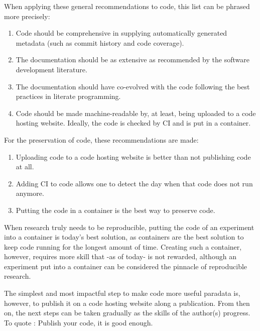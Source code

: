 {When applying these general recommendations to code, 
this list can be phrased more precisely:

\begin{enumerate}
  \item Code should be comprehensive 
    in supplying automatically generated metadata (such as commit history and code coverage).
  \item The documentation should be as extensive as recommended by the 
    software development literature.
  \item The documentation should have co-evolved with the
    code following the best practices in literate programming. 
  \item Code should be made machine-readable by, at least,
    being uploaded to a code hosting website.
    Ideally, the code is checked by CI and is put in a container.
\end{enumerate}

For the preservation of code, these recommendations are made:

\begin{enumerate}
  \item Uploading code to a code hosting website is better than
    not publishing code at all.
  \item Adding CI to code allows one to detect the day when that code 
    does not run anymore.
  \item Putting the code in a container is the best way to preserve code.
\end{enumerate}


When research truly needs to be reproducible, putting the code 
of an experiment into a container is today's best solution,
as containers are the best solution to keep code running for the longest 
amount of time.
Creating such a container, however, requires more skill
that -as of today- is not rewarded,
although an experiment put into a container 
can be considered the pinnacle of reproducible research.


The simplest and most impactful step to make code more useful paradata
is, however, to publish it on a code hosting website 
along a publication. From then on, the next steps can be taken 
gradually as the skills of the author(s) progress.
To quote \cite{barnes2010publish}: Publish your code, it is good enough.

}
